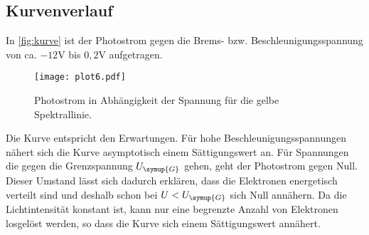 \subsection{Kurvenverlauf}
\label{sec:Kurvenverlauf}
In \autoref{fig:kurve} ist der Photostrom gegen die Brems- bzw. Beschleunigungsspannung von ca.
$-12\unit{\volt}$ bis $0,2\unit{\volt}$ aufgetragen.
\begin{figure}[H]
    \centering
    \caption{Photostrom in Abhängigkeit der Spannung für die gelbe Spektrallinie.}
    \label{fig:kurve}
    \texttt{[image: plot6.pdf]}
\end{figure}
Die Kurve entspricht den Erwartungen. Für hohe Beschleunigungsspannungen nähert sich die Kurve asymptotisch
einem Sättigungswert an. Für Spannungen die gegen die Grenzspannung $U_{\symup{G}}$ gehen, geht der Photostrom
gegen Null. Dieser Umstand lässt sich dadurch erklären, dass die Elektronen energetisch verteilt sind und deshalb
schon bei $U<U_{\symup{G}}$ sich Null annähern. Da die Lichtintensität konstant ist, kann nur eine begrenzte
Anzahl von Elektronen losgelöst werden, so dass die Kurve sich einem Sättigungswert annähert.